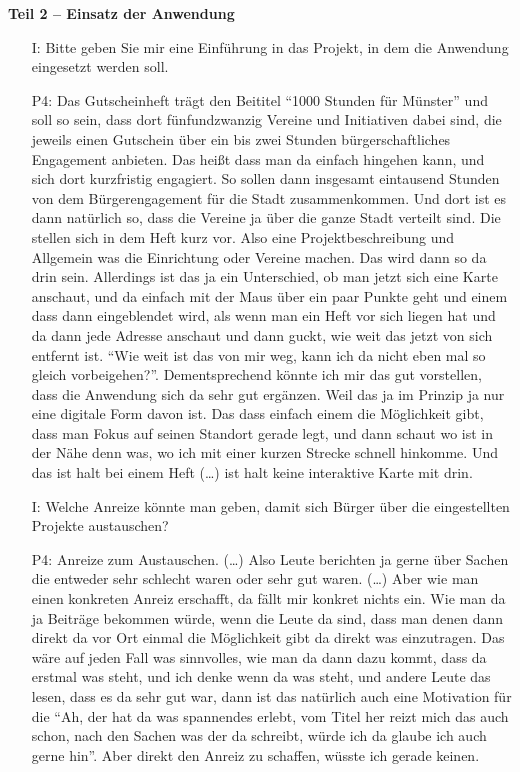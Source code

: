 \textbf{Teil 2 -- Einsatz der Anwendung}
\begin{itemize}
    \item[I:] Bitte geben Sie mir eine Einf{\"u}hrung in das Projekt, in dem die Anwendung eingesetzt werden soll.
    \item[P4:] Das Gutscheinheft tr{\"a}gt den Beititel "`1000 Stunden f{\"u}r M{\"u}nster"' und soll so sein, dass dort f{\"u}nfundzwanzig Vereine und Initiativen dabei sind, die jeweils einen Gutschein {\"u}ber ein bis zwei Stunden b{\"u}rgerschaftliches Engagement anbieten. Das hei{\ss}t dass man da einfach hingehen kann, und sich dort kurzfristig engagiert. So sollen dann insgesamt eintausend Stunden von dem B{\"u}rgerengagement f{\"u}r die Stadt zusammenkommen. Und dort ist es dann nat{\"u}rlich so, dass die Vereine ja {\"u}ber die ganze Stadt verteilt sind. Die stellen sich in dem Heft kurz vor. Also eine Projektbeschreibung und Allgemein was die Einrichtung oder Vereine machen. Das wird dann so da drin sein. Allerdings ist das ja ein Unterschied, ob man jetzt sich eine Karte anschaut, und da einfach mit der Maus {\"u}ber ein paar Punkte geht und einem dass dann eingeblendet wird, als wenn man ein Heft vor sich liegen hat und da dann jede Adresse anschaut und dann guckt, wie weit das jetzt von sich entfernt ist. "`Wie weit ist das von mir weg, kann ich da nicht eben mal so gleich vorbeigehen?"'. Dementsprechend k{\"o}nnte ich mir das gut vorstellen, dass die Anwendung sich da sehr gut erg{\"a}nzen. Weil das ja im Prinzip ja nur eine digitale Form davon ist. Das dass einfach einem die M{\"o}glichkeit gibt, dass man Fokus auf seinen Standort gerade legt, und dann schaut wo ist in der N{\"a}he denn was, wo ich mit einer kurzen Strecke schnell hinkomme. Und das ist halt bei einem Heft (\dots) ist halt keine interaktive Karte mit drin.
    \item[I:] Welche Anreize k{\"o}nnte man geben, damit sich B{\"u}rger {\"u}ber die eingestellten Projekte austauschen?
    \item[P4:] Anreize zum Austauschen. (\dots) Also Leute berichten ja gerne {\"u}ber Sachen die entweder sehr schlecht waren oder sehr gut waren. (\dots) Aber wie man einen konkreten Anreiz erschafft, da f{\"a}llt mir konkret nichts ein. Wie man da ja Beitr{\"a}ge bekommen w{\"u}rde, wenn die Leute da sind, dass man denen dann direkt da vor Ort einmal die M{\"o}glichkeit gibt da direkt was einzutragen. Das w{\"a}re auf jeden Fall was sinnvolles, wie man da dann dazu kommt, dass da erstmal was steht, und ich denke wenn da was steht, und andere Leute das lesen, dass es da sehr gut war, dann ist das nat{\"u}rlich auch eine Motivation f{\"u}r die "`Ah, der hat da was spannendes erlebt, vom Titel her reizt mich das auch schon, nach den Sachen was der da schreibt, w{\"u}rde ich da glaube ich auch gerne hin"'. Aber direkt den Anreiz zu schaffen, w{\"u}sste ich gerade keinen.

\end{itemize}

